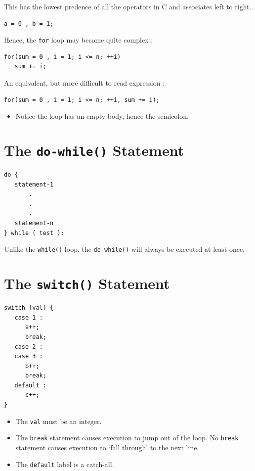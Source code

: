 \documentclass[a4,portraitt]{slides}
\begin{document}
This has the lowest predence of all the operators in C
and associates left to right.

\begin{verbatim}
a = 0 , b = 1;
\end{verbatim}

Hence, the \verb^for^ loop may become quite complex :

\begin{verbatim}
for(sum = 0 , i = 1; i <= n; ++i)
   sum += i;
\end{verbatim}

An equivalent, but more difficult to read expression :

{\small
\begin{verbatim}
for(sum = 0 , i = 1; i <= n; ++i, sum += i);
\end{verbatim}
}

\begin{itemize}
\item Notice the loop has an empty body, hence the semicolon.
\end{itemize}

\newpage
\section*{The {\tt do-while()} Statement}

\begin{verbatim}
do {
   statement-1
       .
       .
       .
   statement-n
} while ( test );
\end{verbatim}

Unlike the \verb^while()^ loop, the \verb^do-while()^ will always
be executed at least once.

\newpage
\section*{The {\tt switch()} Statement}

\begin{verbatim}
switch (val) {
   case 1 :
      a++;
      break;
   case 2 :
   case 3 :
      b++;
      break;
   default :
      c++;
}
\end{verbatim}

\begin{itemize}
\item The \verb^val^ must be an integer.
\item The \verb^break^ statement causes execution to jump out
of the loop. No \verb^break^ statement causes execution to
`fall through' to the next line.
\item The \verb^default^ label is a catch-all.
\end{itemize}
\end{document}
